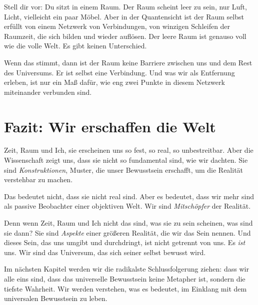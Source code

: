 Stell dir vor: Du sitzt in einem Raum. Der Raum scheint leer zu sein, nur Luft, Licht, vielleicht ein paar Möbel. Aber in der Quantensicht ist der Raum selbst erfüllt von einem Netzwerk von Verbindungen, von winzigen Schleifen der Raumzeit, die sich bilden und wieder auflösen. Der \glqq leere\grqq{} Raum ist genauso voll wie die \glqq volle\grqq{} Welt. Es gibt keinen Unterschied.

Wenn das stimmt, dann ist der Raum keine Barriere zwischen uns und dem Rest des Universums. Er ist selbst eine Verbindung. Und was wir als \glqq Entfernung\grqq{} erleben, ist nur ein Maß dafür, wie eng zwei Punkte in diesem Netzwerk miteinander verbunden sind.

\section{Fazit: Wir erschaffen die Welt}

Zeit, Raum und Ich, sie erscheinen uns so fest, so real, so unbestreitbar. Aber die Wissenschaft zeigt uns, dass sie nicht so fundamental sind, wie wir dachten. Sie sind \emph{Konstruktionen}, Muster, die unser Bewusstsein erschafft, um die Realität verstehbar zu machen.

Das bedeutet nicht, dass sie nicht real sind. Aber es bedeutet, dass wir mehr sind als passive Beobachter einer objektiven Welt. Wir sind \emph{Mitschöpfer} der Realität.

Denn wenn Zeit, Raum und Ich nicht das sind, was sie zu sein scheinen, was sind sie dann? Sie sind \emph{Aspekte} einer größeren Realität, die wir das Sein nennen. Und dieses Sein, das uns umgibt und durchdringt, ist nicht getrennt von uns. Es \emph{ist} uns. Wir sind das Universum, das sich seiner selbst bewusst wird.

Im nächsten Kapitel werden wir die radikalste Schlussfolgerung ziehen: dass wir alle eins sind, dass das universelle Bewusstsein keine Metapher ist, sondern die tiefste Wahrheit. Wir werden verstehen, was es bedeutet, im Einklang mit dem universalen Bewusstsein zu leben.
